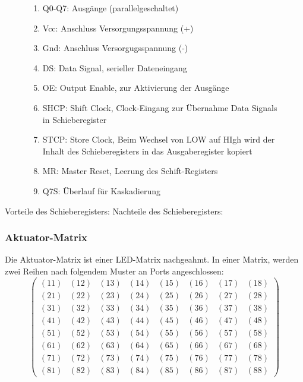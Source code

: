 \begin{figure}[htbp]
\begin{minipage}{0.4\textwidth}
\end{minipage}
\begin{minipage}{0.6\textwidth}
	\begin{enumerate}
		\item Q0-Q7: Ausgänge (parallelgeschaltet)
		\item Vcc: Anschluss Versorgungsspannung (+)
		\item Gnd: Anschluss Versorgugsspannung (-)
		\item DS: Data Signal, serieller Dateneingang
		\item OE: Output Enable, zur Aktivierung der Ausgänge
		\item SHCP: Shift Clock, Clock-Eingang zur Übernahme Data Signals in Schieberegister
		\item STCP: Store Clock, Beim Wechsel von LOW auf HIgh wird der Inhalt des Schieberegisters in das Ausgaberegister kopiert %
		\item MR: Master Reset, Leerung des Schift-Registers
		\item Q7S: Überlauf für Kaskadierung
	\end{enumerate}
\end{minipage}
\end{figure}

Vorteile des Schieberegisters:\newline
Nachteile des Schieberegisters:

\subsubsection{Aktuator-Matrix}
Die Aktuator-Matrix ist einer LED-Matrix nachgeahmt.
In einer Matrix, werden zwei Reihen nach folgendem Muster an Ports angeschlossen:
$$
\begin{pmatrix}
	(11) & (12) & (13) & (14) & (15) & (16) & (17) & (18) \\
	(21) & (22) & (23) & (24) & (25) & (26) & (27) & (28) \\
	(31) & (32) & (33) & (34) & (35) & (36) & (37) & (38) \\
	(41) & (42) & (43) & (44) & (45) & (46) & (47) & (48) \\
	(51) & (52) & (53) & (54) & (55) & (56) & (57) & (58) \\
	(61) & (62) & (63) & (64) & (65) & (66) & (67) & (68) \\
	(71) & (72) & (73) & (74) & (75) & (76) & (77) & (78) \\
	(81) & (82) & (83) & (84) & (85) & (86) & (87) & (88)
\end{pmatrix}
$$

